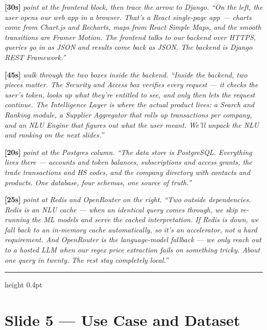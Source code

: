 \documentclass[11pt,a4paper]{article}
\newcommand{\beat}[1]{\textcolor{accent}{\textbf{[#1]}}}
\newcommand{\stage}[1]{{\itshape\color{stageborder}#1}}
\begin{document}
\vspace{0.4em}

\beat{30s} \stage{point at the frontend block, then trace the arrow to Django.}
\textit{``On the left, the user opens our web app in a browser. That's a React single-page app --- charts come from Chart.js and Recharts, maps from React Simple Maps, and the smooth transitions are Framer Motion. The frontend talks to our backend over HTTPS, queries go in as JSON and results come back as JSON. The backend is Django REST Framework.''}

\vspace{0.4em}

\beat{45s} \stage{walk through the two boxes inside the backend.}
\textit{``Inside the backend, two pieces matter. The Security and Access box verifies every request --- it checks the user's token, looks up what they're entitled to see, and only then lets the request continue. The Intelligence Layer is where the actual product lives: a Search and Ranking module, a Supplier Aggregator that rolls up transactions per company, and an NLU Engine that figures out what the user meant. We'll unpack the NLU and ranking on the next slides.''}

\vspace{0.4em}

\beat{20s} \stage{point at the Postgres column.}
\textit{``The data store is PostgreSQL. Everything lives there --- accounts and token balances, subscriptions and access grants, the trade transactions and HS codes, and the company directory with contacts and products. One database, four schemas, one source of truth.''}

\vspace{0.4em}

\beat{25s} \stage{point at Redis and OpenRouter on the right.}
\textit{``Two outside dependencies. Redis is an NLU cache --- when an identical query comes through, we skip re-running the ML models and serve the cached interpretation. If Redis is down, we fall back to an in-memory cache automatically, so it's an accelerator, not a hard requirement. And OpenRouter is the language-model fallback --- we only reach out to a hosted LLM when our regex price extraction fails on something tricky. About one query in twenty. The rest stay completely local.''}

\hrule height 0.4pt
\vspace{0.5em}

\section{Slide 5 --- Use Case and Dataset}
\end{document}
